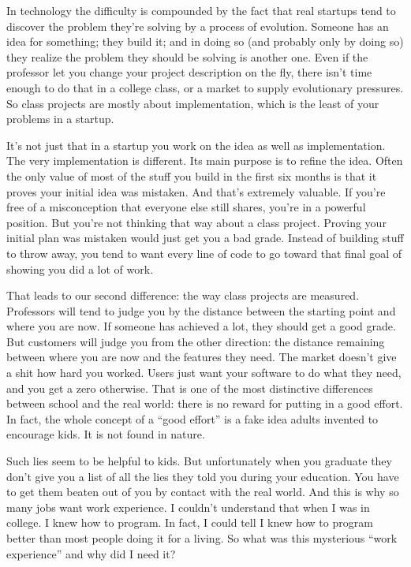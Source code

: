 In technology the difficulty is compounded by the fact that real
startups tend to discover the problem they're solving by a process of
evolution. Someone has an idea for something; they build it; and in
doing so (and probably only by doing so) they realize the problem they
should be solving is another one. Even if the professor let you change
your project description on the fly, there isn't time enough to do that
in a college class, or a market to supply evolutionary pressures. So
class projects are mostly about implementation, which is the least of
your problems in a startup.

It's not just that in a startup you work on the idea as well as
implementation. The very implementation is different. Its main purpose
is to refine the idea. Often the only value of most of the stuff you
build in the first six months is that it proves your initial idea was
mistaken. And that's extremely valuable. If you're free of a
misconception that everyone else still shares, you're in a powerful
position. But you're not thinking that way about a class project.
Proving your initial plan was mistaken would just get you a bad grade.
Instead of building stuff to throw away, you tend to want every line of
code to go toward that final goal of showing you did a lot of work.

That leads to our second difference: the way class projects are
measured. Professors will tend to judge you by the distance between the
starting point and where you are now. If someone has achieved a lot,
they should get a good grade. But customers will judge you from the
other direction: the distance remaining between where you are now and
the features they need. The market doesn't give a shit how hard you
worked. Users just want your software to do what they need, and you get
a zero otherwise. That is one of the most distinctive differences
between school and the real world: there is no reward for putting in a
good effort. In fact, the whole concept of a ``good effort'' is a fake
idea adults invented to encourage kids. It is not found in nature.

Such lies seem to be helpful to kids. But unfortunately when you
graduate they don't give you a list of all the lies they told you during
your education. You have to get them beaten out of you by contact with
the real world. And this is why so many jobs want work experience. I
couldn't understand that when I was in college. I knew how to program.
In fact, I could tell I knew how to program better than most people
doing it for a living. So what was this mysterious ``work experience''
and why did I need it?

